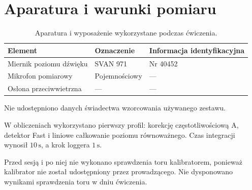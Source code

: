 \section{Aparatura i warunki pomiaru}
\label{sec:aparatura}
\begin{table}[H]
 \centering
 \caption{Aparatura i wyposażenie wykorzystane podczas ćwiczenia.}
 \label{tab:aparatura}
 \begin{tabularx}{\linewidth}{@{}L L L@{}}
 \toprule
 Element & Oznaczenie & Informacja identyfikacyjna \\
 \midrule
 Miernik poziomu dźwięku & SVAN 971 & Nr 40452 \\
 Mikrofon pomiarowy & Pojemnościowy & --- \\
 Osłona przeciwwietrzna & --- & --- \\
 \bottomrule
 \end{tabularx}
\end{table}
Nie udostępniono danych świadectwa
wzorcowania używanego zestawu.

W obliczeniach wykorzystano pierwszy profil: korekcję
częstotliwościową A, detektor Fast i liniowe całkowanie poziomu
równoważnego. Czas integracji wynosił $10\,\mathrm{s}$,
a krok loggera $1\,\mathrm{s}$.

Przed sesją i po niej nie wykonano sprawdzenia toru kalibratorem,
ponieważ kalibrator nie został udostępniony przez prowadzącego.
Nie dysponowano wynikami sprawdzenia toru w dniu ćwiczenia.
